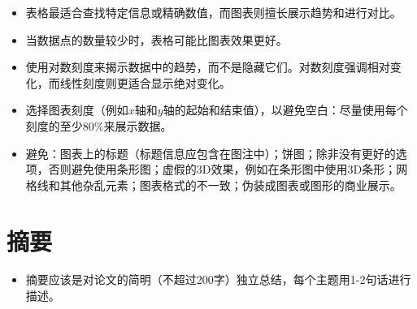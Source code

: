 \begin{itemize}
\item 表格最适合查找特定信息或精确数值，而图表则擅长展示趋势和进行对比。
\item 当数据点的数量较少时，表格可能比图表效果更好。
\item 使用对数刻度来揭示数据中的趋势，而不是隐藏它们。对数刻度强调相对变化，而线性刻度则更适合显示绝对变化。
\item 选择图表刻度（例如$x$轴和$y$轴的起始和结束值），以避免空白：尽量使用每个刻度的至少$80 \%$来展示数据。
\item 避免：图表上的标题（标题信息应包含在图注中）；饼图；除非没有更好的选项，否则避免使用条形图；虚假的3D效果，例如在条形图中使用3D条形；网格线和其他杂乱元素；图表格式的不一致；伪装成图表或图形的商业展示。
\end{itemize}

\section*{摘要}
\begin{itemize}
\item 摘要应该是对论文的简明（不超过200字）独立总结，每个主题用1-2句话进行描述。
\end{itemize}

